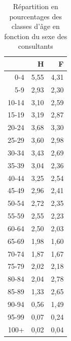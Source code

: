 \documentclass[12pt,english,french,twoside]{book}\usepackage[]{graphicx}\usepackage[]{color}
\begin{document}
\begin{table}[ht]
\centering
\begin{tabular}{rrr}
  \hline
 & H & F \\ 
  \hline
0-4 & 5,55 & 4,31 \\ 
  5-9 & 2,93 & 2,30 \\ 
  10-14 & 3,10 & 2,59 \\ 
  15-19 & 3,19 & 2,87 \\ 
  20-24 & 3,68 & 3,30 \\ 
  25-29 & 3,60 & 2,98 \\ 
  30-34 & 3,43 & 2,69 \\ 
  35-39 & 3,04 & 2,36 \\ 
  40-44 & 3,25 & 2,54 \\ 
  45-49 & 2,96 & 2,41 \\ 
  50-54 & 2,72 & 2,35 \\ 
  55-59 & 2,55 & 2,23 \\ 
  60-64 & 2,50 & 2,03 \\ 
  65-69 & 1,98 & 1,60 \\ 
  70-74 & 1,87 & 1,67 \\ 
  75-79 & 2,02 & 2,18 \\ 
  80-84 & 2,04 & 2,78 \\ 
  85-89 & 1,33 & 2,65 \\ 
  90-94 & 0,56 & 1,49 \\ 
  95-99 & 0,07 & 0,24 \\ 
  100+ & 0,02 & 0,04 \\ 
   \hline
\end{tabular}
\caption[Sexe et age en pourcentages]{Répartition en pourcentages des classes d'âge en fonction du sexe des consultants} 
\label{tab:pyr_p100}
\end{table}
\end{document}
